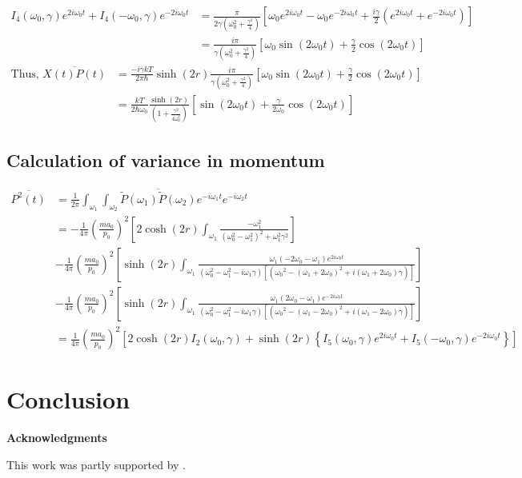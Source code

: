 \documentclass[12pt, twoside]{article}
\begin{document}
$\begin{aligned}
I_4(\omega_0,\gamma) e^{2i\omega_0 t} + I_4(-\omega_0,\gamma)e^{-2i\omega_0 t} &= \frac{\pi}{2\gamma(\omega_0 ^2 + \frac{\gamma^2}{4})} \left[\omega_0 e^{2i\omega_0 t} - \omega_{ 0 } e^{-2 i \omega_0 t} + \frac{i\gamma}{2}(e^{2i\omega_0 t} + e^{-2i \omega_0 t})\right]
\\&= \frac{i \pi}{\gamma(\omega_0 ^2 + \frac{\gamma^2}{4})} \left[\omega_0 \sin(2\omega_0 t) + \frac{\gamma}{2}\cos(2\omega_0 t)\right]
\end{aligned}$
\begin{equation}
\begin{aligned}
\text{Thus, } \overline{X( t ) P(t)} &= \frac{-i\gamma k T}{2 \pi \hbar} \sinh(2r) \frac{i \pi}{\gamma(\omega_0 ^2 + \frac{\gamma^2}{4})} \left[\omega_0 \sin(2\omega_0 t) + \frac{\gamma}{2}\cos(2\omega_0 t)\right] \\&= \frac{k T}{2 \hbar \omega_0}  \frac{\sinh(2r)}{(1 + \frac{\gamma^2}{4\omega_0 ^2})} \left[ \sin(2\omega_0 t) + \frac{\gamma}{2\omega_0}\cos(2\omega_0 t)\right]
\end{aligned}
\end{equation}
\subsection{Calculation of variance in momentum}
$\begin{aligned} \overline{P ^ { 2 } ( t )} &= \frac { 1 } { 2 \pi } \int _ { \omega _ { 1 }}\int_{\omega_2} \overline{\widetilde { P } ( \omega_1 )\widetilde { P } ( \omega_2 )}  e ^ { - i \omega _ { 1 } t } e ^ { - i \omega _ { 2 } t } \\&= -\frac{1}{4\pi}\left(\frac { m a_0 } { p _ { 0 } }\right)^2 \left[ 2 \cosh(2r) \int_{\omega_1} \frac{-\omega_{ 1 }^2}{(\omega_0^2 - \omega_1 ^2)^2 + \omega_1 ^2 \gamma^2}\right] \\&- \frac{1}{4\pi}\left(\frac { m a_0 } { p _ { 0 } }\right)^2 \left[ \sinh(2r) \int_{\omega_1} \frac{\omega_1 (-2\omega_0 - \omega_1)e^{2i\omega_0 t}}{(\omega_0^2 - \omega_1 ^2 - i\omega_1\gamma) [({\omega_0}^2 - (\omega_1 + 2\omega_0)^2 + i(\omega_1 + 2 \omega_0) \gamma)]}\right]
\\&- \frac{1}{4\pi}\left(\frac { m a_0 } { p _ { 0 } }\right)^2 \left[ \sinh(2r) \int_{\omega_1} \frac{\omega_1 (2\omega_0 - \omega_1)e^{-2i\omega_0 t}}{(\omega_0^2 - \omega_1 ^2 - i\omega_1\gamma) [({\omega_0}^2 - (\omega_1 - 2\omega_0)^2 + i(\omega_1 - 2 \omega_0) \gamma)]}\right] \\&= \frac{1}{4\pi}\left(\frac { m a_0 } { p _ { 0 } }\right)^2 \left[2\cosh(2r) I_2(\omega_0,\gamma) + \sinh(2r)\left\{I_5(\omega_0,\gamma)e^{2i\omega_0 t}+I_5(-\omega_0,\gamma)e^{-2i\omega_0 t}\right\} \right] \end{aligned}$

\section{Conclusion}

\vspace{1.5cm}
\noindent \textbf{Acknowledgments}

\noindent \small{This work was partly supported by .}



\end{document}
